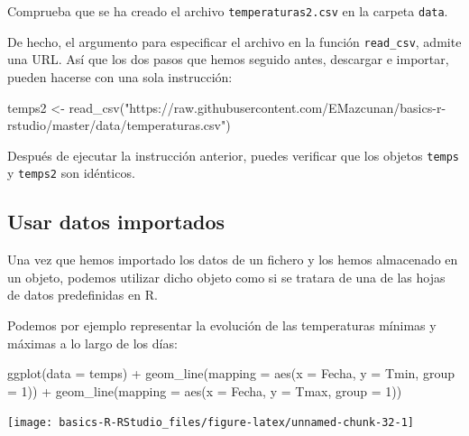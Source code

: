 \documentclass[
  degree=mecinf,
  title=normal,
  toc=normal,
  bib=normal]{mnye}
\newenvironment{Shaded}{\begin{snugshade}}{\end{snugshade}}
\newcommand{\AttributeTok}[1]{\textcolor[rgb]{0.77,0.63,0.00}{#1}}
\newcommand{\DecValTok}[1]{\textcolor[rgb]{0.00,0.00,0.81}{#1}}
\newcommand{\FunctionTok}[1]{\textcolor[rgb]{0.00,0.00,0.00}{#1}}
\newcommand{\NormalTok}[1]{#1}
\newcommand{\OtherTok}[1]{\textcolor[rgb]{0.56,0.35,0.01}{#1}}
\newcommand{\SpecialCharTok}[1]{\textcolor[rgb]{0.00,0.00,0.00}{#1}}
\newcommand{\StringTok}[1]{\textcolor[rgb]{0.31,0.60,0.02}{#1}}
\begin{document}
Comprueba que se ha creado el archivo \texttt{temperaturas2.csv} en la carpeta \texttt{data}.

De hecho, el argumento para especificar el archivo en la función \texttt{read\_csv}, admite una URL. Así que los dos pasos que hemos seguido antes, descargar e importar, pueden hacerse con una sola instrucción:

\begin{Shaded}
\begin{Highlighting}[]
\NormalTok{temps2 }\OtherTok{\textless{}{-}} \FunctionTok{read\_csv}\NormalTok{(}\StringTok{"https://raw.githubusercontent.com/EMazcunan/basics{-}r{-}rstudio/master/data/temperaturas.csv"}\NormalTok{)}
\end{Highlighting}
\end{Shaded}

Después de ejecutar la instrucción anterior, puedes verificar que los objetos \texttt{temps} y \texttt{temps2} son idénticos.

\hypertarget{usar-datos-importados}{%
\subsection{Usar datos importados}\label{usar-datos-importados}}

Una vez que hemos importado los datos de un fichero y los hemos almacenado en un objeto, podemos utilizar dicho objeto como si se tratara de una de las hojas de datos predefinidas en \textsf{R}.

Podemos por ejemplo representar la evolución de las temperaturas mínimas y máximas a lo largo de los días:

\begin{Shaded}
\begin{Highlighting}[]
\FunctionTok{ggplot}\NormalTok{(}\AttributeTok{data =}\NormalTok{ temps) }\SpecialCharTok{+} 
    \FunctionTok{geom\_line}\NormalTok{(}\AttributeTok{mapping =} \FunctionTok{aes}\NormalTok{(}\AttributeTok{x =}\NormalTok{ Fecha, }\AttributeTok{y =}\NormalTok{ Tmin, }\AttributeTok{group  =} \DecValTok{1}\NormalTok{)) }\SpecialCharTok{+} 
    \FunctionTok{geom\_line}\NormalTok{(}\AttributeTok{mapping =} \FunctionTok{aes}\NormalTok{(}\AttributeTok{x =}\NormalTok{ Fecha, }\AttributeTok{y =}\NormalTok{ Tmax, }\AttributeTok{group  =} \DecValTok{1}\NormalTok{)) }
\end{Highlighting}
\end{Shaded}

\begin{center}\texttt{[image: basics-R-RStudio\_files/figure-latex/unnamed-chunk-32-1]} \end{center}
\end{document}
